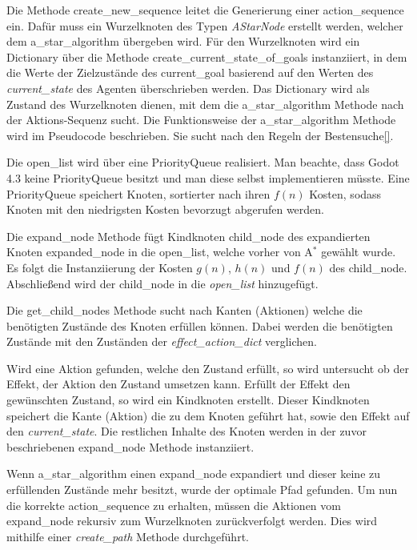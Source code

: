 Die Methode create\_new\_sequence leitet die Generierung einer action\_sequence ein. Dafür muss ein Wurzelknoten des Typen \textit{AStarNode} erstellt werden, welcher dem a\_star\_algorithm übergeben wird. Für den Wurzelknoten wird ein Dictionary über die Methode create\_current\_state\_of\_goals instanziiert, in dem die Werte der Zielzustände des current\_goal basierend auf den Werten des \textit{current\_state} des Agenten überschrieben werden. Das Dictionary wird als Zustand des Wurzelknoten dienen, mit dem die a\_star\_algorithm Methode nach der Aktions-Sequenz sucht. Die Funktionsweise der a\_star\_algorithm Methode wird im Pseudocode beschrieben. Sie sucht nach den Regeln der Bestensuche\ref{}.

Die open\_list wird über eine PriorityQueue realisiert. Man beachte, dass Godot 4.3 keine PriorityQueue besitzt und man diese selbst implementieren müsste. Eine PriorityQueue speichert Knoten, sortierter nach ihren $f(n)$ Kosten, sodass Knoten mit den niedrigsten Kosten bevorzugt abgerufen werden. 

Die expand\_node Methode fügt Kindknoten child\_node des expandierten Knoten expanded\_node in die open\_list, welche vorher von A$^*$ gewählt wurde. Es folgt die Instanziierung der Kosten $g(n)$, $h(n)$ und $f(n)$ des child\_node. Abschlie\ss{}end wird der child\_node in die \textit{open\_list} hinzugefügt.

Die get\_child\_nodes Methode sucht nach Kanten (Aktionen) welche die benötigten Zustände des Knoten erfüllen können. Dabei werden die benötigten Zustände mit den Zuständen der \textit{effect\_action\_dict} verglichen.

Wird eine Aktion gefunden, welche den Zustand erfüllt, so wird untersucht ob der Effekt, der Aktion den Zustand umsetzen kann. Erfüllt der Effekt den gewünschten Zustand, so wird ein Kindknoten erstellt. Dieser Kindknoten speichert die Kante (Aktion) die zu dem Knoten geführt hat, sowie den Effekt auf den \textit{current\_state}. Die restlichen Inhalte des Knoten werden in der zuvor beschriebenen expand\_node Methode instanziiert.

Wenn a\_star\_algorithm einen expand\_node expandiert und dieser keine zu erfüllenden Zustände mehr besitzt, wurde der optimale Pfad gefunden. Um nun die korrekte action\_sequence zu erhalten, müssen die Aktionen vom expand\_node rekursiv zum Wurzelknoten zurückverfolgt werden. Dies wird mithilfe einer \textit{create\_path} Methode durchgeführt.

